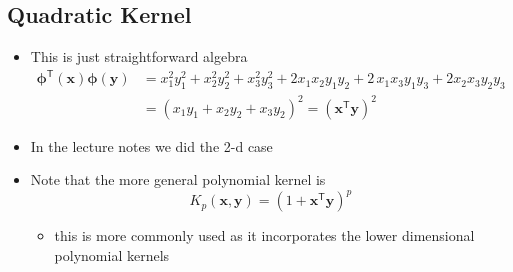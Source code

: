 \documentclass[11pt]{article}
\newcommand{\tr}{\textsf{T}}
\begin{document}
\subsection{Quadratic Kernel}
\label{sec:org45f0488}
\begin{itemize}
\item This is just straightforward algebra
\begin{align*}
   \bm{\phi}^\tr(\bm{x}) \bm{\phi}(\bm{y}) &= x_1^2 y_1^2 + x_2^2
   y_2^2 + x_3^2 y_3^2 + 2 x_1 x_2 y_1 y_2 + 2 \,x_1x_3y_1y_3
+ 2 x_2x_3y_2y_3 \\
  &= (x_1 y_1 + x_2 y_2 +x_3 y_2)^2 = (\bm{x}^\tr\bm{y})^2
\end{align*}
\item In the lecture notes we did the 2-d case
\item Note that the more general polynomial kernel is
$$ K_p(\bm{x},\bm{y})  = (1+\bm{x}^\tr \bm{y})^p $$
\begin{itemize}
\item this is more commonly used as it incorporates the lower
dimensional polynomial kernels
\end{itemize}
\end{itemize}
\end{document}
